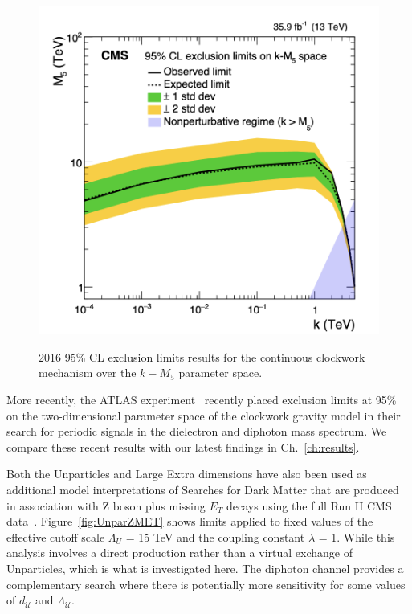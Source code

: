 \begin{figure}[!htbp]
    \centering
    \caption{2016 95\%  CL exclusion limits results for the continuous clockwork mechanism over the $k -M_5$ parameter space.}
    \includegraphics[scale=0.5]{fig/ClockworkCMS.png}
    \label{fig:ClockworkCMS2016}
\end{figure}


More recently, the ATLAS experiment~\cite{ATLAS:2023hbp} recently placed exclusion limits at 95\% on the two-dimensional parameter space of the clockwork gravity model in their search for periodic signals in the dielectron and diphoton mass spectrum. We compare these recent results with our latest findings in Ch.~\ref{ch:results}.


Both the Unparticles and Large Extra dimensions have also been used as additional model interpretations of Searches for Dark Matter that are produced in association with Z boson plus missing $E_{T}$ decays using the full Run II CMS data~\cite{CMS:2020ulv}. Figure~\ref{fig:UnparZMET} shows limits applied to fixed values of the effective cutoff scale $\Lambda_U$ = 15 TeV and the coupling constant $\lambda$ = 1. While this analysis involves a direct production rather than a virtual exchange of Unparticles, which is what is investigated here. The diphoton channel provides a complementary search where there is potentially more sensitivity for some values of $d_{\mathcal{U}}$ and $\Lambda_{\mathcal{U}}$.

